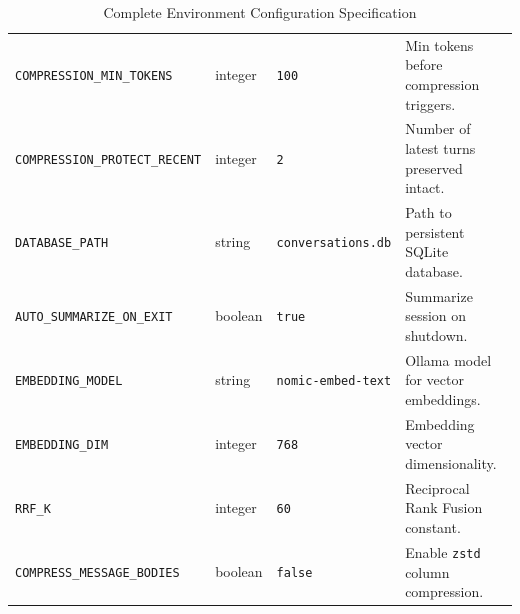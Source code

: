 \begin{table}[htbp]
\begin{tabular}{lllp{5.5cm}}
\texttt{COMPRESSION\_MIN\_TOKENS}& integer & \texttt{100} & Min tokens before compression triggers. \\
\texttt{COMPRESSION\_PROTECT\_RECENT} & integer & \texttt{2} & Number of latest turns preserved intact. \\
\texttt{DATABASE\_PATH} & string & \texttt{conversations.db} & Path to persistent SQLite database. \\
\texttt{AUTO\_SUMMARIZE\_ON\_EXIT}& boolean & \texttt{true} & Summarize session on shutdown. \\
\texttt{EMBEDDING\_MODEL} & string & \texttt{nomic-embed-text} & Ollama model for vector embeddings. \\
\texttt{EMBEDDING\_DIM} & integer & \texttt{768} & Embedding vector dimensionality. \\
\texttt{RRF\_K} & integer & \texttt{60} & Reciprocal Rank Fusion constant. \\
\texttt{COMPRESS\_MESSAGE\_BODIES} & boolean & \texttt{false} & Enable \texttt{zstd} column compression. \\
\bottomrule
\end{tabular}
\caption{Complete Environment Configuration Specification}
\label{tab:env_vars}
\end{table}
